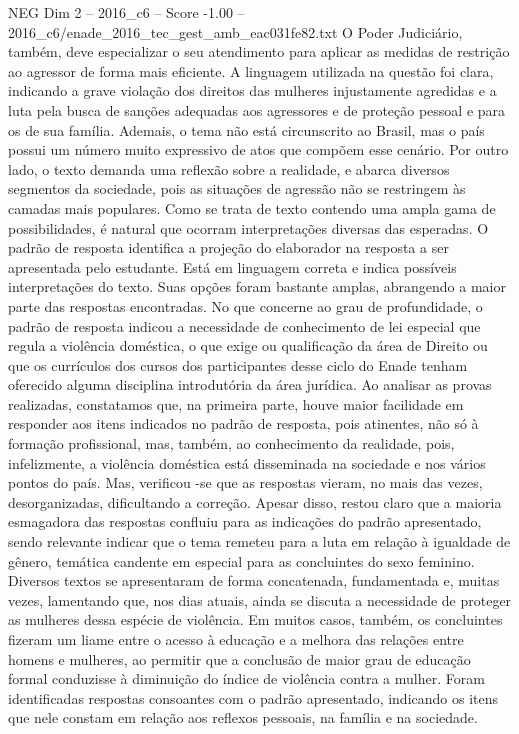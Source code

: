 \begin{textsample}{NEG Dim 2 – 2016\_c6 – Score -1.00 – 2016\_c6/enade\_2016\_tec\_gest\_amb\_eac031fe82.txt}
O Poder Judiciário, também, deve especializar o seu atendimento para aplicar as medidas de restrição ao agressor de forma mais eficiente.
A linguagem utilizada na questão foi clara, indicando a grave violação dos direitos das mulheres injustamente agredidas e a luta pela busca de sanções adequadas aos agressores e de proteção pessoal e para os de sua família.
Ademais, o tema não está circunscrito ao Brasil, mas o país possui um número muito expressivo de atos que compõem esse cenário.
Por outro lado, o texto demanda uma reflexão sobre a realidade, e abarca diversos segmentos da sociedade, pois as situações de agressão não se restringem às camadas mais populares.
Como se trata de texto contendo uma ampla gama de possibilidades, é natural que ocorram interpretações diversas das esperadas.
O padrão de resposta identifica a projeção do elaborador na resposta a ser apresentada pelo estudante.
Está em linguagem correta e indica possíveis interpretações do texto.
Suas opções foram bastante amplas, abrangendo a maior parte das respostas encontradas.
No que concerne ao grau de profundidade, o padrão de resposta indicou a necessidade de conhecimento de lei especial que regula a violência doméstica, o que exige ou qualificação da área de Direito ou que os currículos dos cursos dos participantes desse ciclo do Enade tenham oferecido alguma disciplina introdutória da área jurídica.
Ao analisar as provas realizadas, constatamos que, na primeira parte, houve maior facilidade em responder aos itens indicados no padrão de resposta, pois atinentes, não só à formação profissional, mas, também, ao conhecimento da realidade, pois, infelizmente, a violência doméstica está disseminada na sociedade e nos vários pontos do país.
Mas, verificou -se que as respostas vieram, no mais das vezes, desorganizadas, dificultando a correção.
Apesar disso, restou claro que a maioria esmagadora das respostas confluiu para as indicações do padrão apresentado, sendo relevante indicar que o tema remeteu para a luta em relação à igualdade de gênero, temática candente em especial para as concluintes do sexo feminino.
Diversos textos se apresentaram de forma concatenada, fundamentada e, muitas vezes, lamentando que, nos dias atuais, ainda se discuta a necessidade de proteger as mulheres dessa espécie de violência.
Em muitos casos, também, os concluintes fizeram um liame entre o acesso à educação e a melhora das relações entre homens e mulheres, ao permitir que a conclusão de maior grau de educação formal conduzisse à diminuição do índice de violência contra a mulher.
Foram identificadas respostas consoantes com o padrão apresentado, indicando os itens que nele constam em relação aos reflexos pessoais, na família e na sociedade.

\end{textsample}
